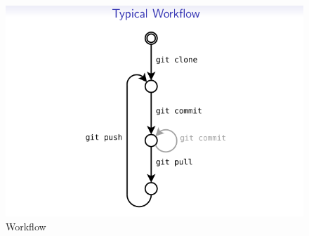 \documentclass[11pt,a4paper]{article}
\begin{document}
\begin{figure}[H]
    \begin{center}
        \includegraphics[scale=0.4]{clone-workflow.png}
        \caption{Workflow}       
    \end{center}
\end{figure}
\end{document}
